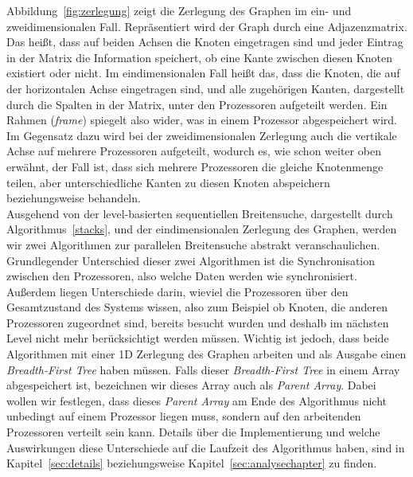 \documentclass[11pt,a4paper]{article}
\begin{document}
Abbildung~\ref{fig:zerlegung} zeigt die Zerlegung des Graphen im ein- und zweidimensionalen Fall. Repräsentiert wird der Graph durch eine Adjazenzmatrix. Das heißt, dass auf beiden Achsen die Knoten eingetragen sind und jeder Eintrag in der Matrix die Information speichert, ob eine Kante zwischen diesen Knoten existiert oder nicht.  Im eindimensionalen Fall heißt das, dass die Knoten, die auf der horizontalen Achse eingetragen sind, und alle zugehörigen Kanten, dargestellt durch die Spalten in der Matrix, unter den Prozessoren aufgeteilt werden. Ein Rahmen (\textit{frame}) spiegelt also wider, was in einem Prozessor abgespeichert wird. Im Gegensatz dazu wird bei der zweidimensionalen Zerlegung auch die vertikale Achse auf mehrere Prozessoren aufgeteilt, wodurch es, wie schon weiter oben erwähnt, der Fall ist, dass sich mehrere Prozessoren die gleiche Knotenmenge teilen, aber unterschiedliche Kanten zu diesen Knoten abspeichern beziehungsweise behandeln.\\
Ausgehend von der level-basierten sequentiellen Breitensuche, dargestellt durch Algorithmus~\ref{stacks}, und der eindimensionalen Zerlegung des Graphen, werden wir zwei Algorithmen zur parallelen Breitensuche abstrakt veranschaulichen. Grundlegender Unterschied dieser zwei Algorithmen ist die Synchronisation zwischen den Prozessoren, also welche Daten werden wie synchronisiert. Außerdem liegen Unterschiede darin, wieviel die Prozessoren über den Gesamtzustand des Systems wissen, also zum Beispiel ob Knoten, die anderen Prozessoren zugeordnet sind, bereits besucht wurden und deshalb im nächsten Level nicht mehr berücksichtigt werden müssen. Wichtig ist jedoch, dass beide Algorithmen mit einer 1D Zerlegung des Graphen arbeiten und als Ausgabe einen \textit{Breadth-First Tree} haben müssen. Falls dieser \textit{Breadth-First Tree} in einem Array abgespeichert ist, bezeichnen wir dieses Array auch als \textit{Parent Array}.  Dabei wollen wir festlegen, dass dieses \textit{Parent Array} am Ende des Algorithmus nicht unbedingt auf einem Prozessor liegen muss, sondern auf den arbeitenden Prozessoren verteilt sein kann. Details über die Implementierung und welche Auswirkungen diese Unterschiede auf die Laufzeit des Algorithmus haben, sind in Kapitel~\ref{sec:details} beziehungsweise Kapitel~\ref{sec:analysechapter} zu finden.
\end{document}
